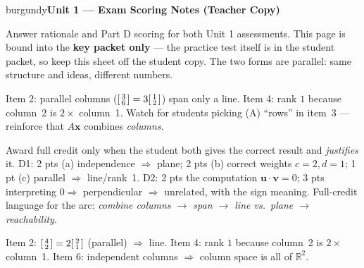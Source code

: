 \documentclass[10pt]{article}
\newcommand{\vv}{\mathbf{v}}
\newcommand{\uu}{\mathbf{u}}
\newcommand{\xx}{\mathbf{x}}
\begin{document}


\newpage
\begin{headlinebox}{burgundy}{\color{white}\bfseries Unit 1 --- Exam Scoring Notes (Teacher Copy)}\end{headlinebox}

\vspace{4pt}
\noindent\small
Answer rationale and Part D scoring for both Unit 1 assessments. This page is bound into the
\textbf{key packet only} --- the practice test itself is in the student packet, so keep this sheet
off the student copy. The two forms are parallel: same structure and ideas, different numbers.

\vspace{6pt}

\begin{teachernote}
Item 2: parallel columns ($\begin{bsmallmatrix}3\\6\end{bsmallmatrix}=3\begin{bsmallmatrix}1\\2\end{bsmallmatrix}$)
span only a line. Item 4: rank $1$ because column~2 is $2\times$ column~1. Watch for students
picking (A) ``rows'' in item~3 --- reinforce that $A\xx$ combines \emph{columns}.
\end{teachernote}

\begin{teachernote}
Award full credit only when the student both gives the correct result and \emph{justifies} it.
D1: 2 pts (a) independence $\Rightarrow$ plane; 2 pts (b) correct weights $c=2,d=1$; 1 pt (c)
parallel $\Rightarrow$ line/rank~1. D2: 2 pts the computation $\uu\cdot\vv=0$; 3 pts interpreting
$0\Rightarrow$ perpendicular $\Rightarrow$ unrelated, with the sign meaning. Full-credit language
for the arc: \emph{combine columns $\to$ span $\to$ line vs.\ plane $\to$ reachability}.
\end{teachernote}

\begin{teachernote}
Item 2: $\begin{bsmallmatrix}4\\2\end{bsmallmatrix}=2\begin{bsmallmatrix}2\\1\end{bsmallmatrix}$
(parallel) $\Rightarrow$ line. Item 4: rank $1$ because column~2 is $2\times$ column~1. Item 6:
independent columns $\Rightarrow$ column space is all of $\mathbb R^2$.
\end{teachernote}
\end{document}
